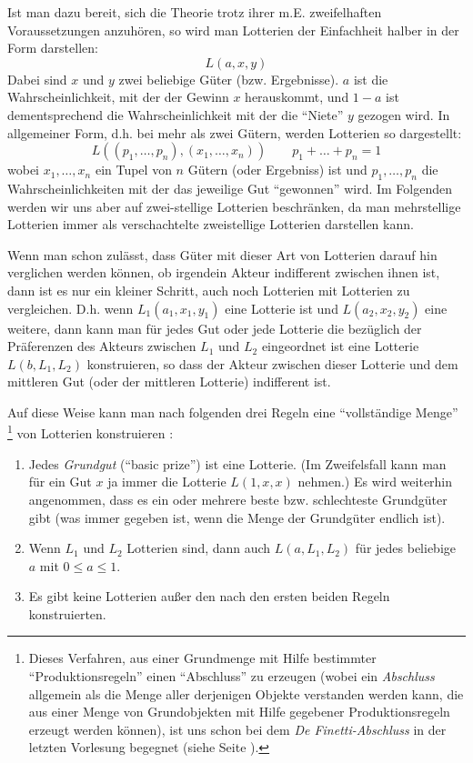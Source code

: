 Ist man dazu bereit, sich die Theorie trotz ihrer m.E. zweifelhaften
Voraussetzungen anzuhören, so wird man Lotterien der Einfachheit halber in der
Form darstellen:
\[ L(a, x, y) \] 
Dabei sind $x$ und $y$ zwei beliebige Güter (bzw. Ergebnisse).
$a$ ist die Wahrscheinlichkeit, mit der der Gewinn $x$ herauskommt, und $1-a$ ist
dementsprechend die Wahrscheinlichkeit mit der die "`Niete"' $y$ gezogen wird. In
allgemeiner Form, d.h. bei mehr als zwei Gütern, werden Lotterien so dargestellt:
\[L((p_1,\ldots,p_n), (x_1,\ldots,x_n)) \qquad p_1 + \ldots + p_n = 1\] 
wobei
$x_1,\ldots, x_n$ ein Tupel von $n$ Gütern (oder Ergebniss) ist und $p_1,\ldots,
p_n$ die Wahrscheinlichkeiten mit der das jeweilige Gut "`gewonnen"' wird.
Im Folgenden werden wir uns aber auf zwei-stellige Lotterien beschränken, da
man mehrstellige Lotterien immer als verschachtelte zweistellige Lotterien
darstellen kann.

Wenn man schon zulässt, dass Güter mit dieser Art von Lotterien darauf hin
verglichen werden können, ob irgendein Akteur indifferent zwischen ihnen ist,
dann ist es nur ein kleiner Schritt, auch noch Lotterien mit Lotterien zu
vergleichen. D.h. wenn $L_1(a_1, x_1, y_1)$ eine Lotterie ist und 
$L(a_2, x_2, y_2)$ eine weitere, dann kann man für jedes Gut oder jede
Lotterie die bezüglich der Präferenzen des Akteurs zwischen $L_1$ und $L_2$
eingeordnet ist eine Lotterie $L(b, L_1, L_2)$ konstruieren, so dass der Akteur
zwischen dieser Lotterie und dem mittleren Gut (oder der mittleren Lotterie)
indifferent ist. 

Auf diese Weise kann man nach folgenden drei Regeln eine "`vollständige Menge"'
\label{MengeVonLotterien}
\footnote{Dieses Verfahren, aus einer Grundmenge mit Hilfe bestimmter
"`Produktionsregeln"' einen "`Abschluss"' zu erzeugen (wobei ein {\em Abschluss}
allgemein als die Menge aller derjenigen Objekte verstanden werden kann, die aus
einer Menge von Grundobjekten mit Hilfe gegebener Produktionsregeln erzeugt
werden können), ist uns schon bei dem {\em De Finetti-Abschluss} in der letzten
Vorlesung begegnet (siehe Seite \pageref{DeFinettiAbschluss}).} von Lotterien
konstruieren \cite[S. 91]{resnik:1987}:
\begin{enumerate}
  \item Jedes {\em Grundgut} ("`basic prize"') ist eine Lotterie. (Im
  Zweifelsfall kann man für ein Gut $x$ ja immer die Lotterie $L(1, x, x)$
  nehmen.) \label{bestesSchlechtestesGut} Es wird
  weiterhin angenommen, dass es ein oder mehrere beste bzw. schlechteste
  Grundgüter gibt (was immer gegeben ist, wenn die Menge der Grundgüter endlich
  ist).
  \item Wenn $L_1$ und $L_2$ Lotterien sind, dann auch $L(a, L_1, L_2)$ für
  jedes beliebige $a$ mit $0 \leq a \leq 1$.
  \item Es gibt keine Lotterien außer den nach den ersten beiden Regeln
  konstruierten.
\end{enumerate}
 
